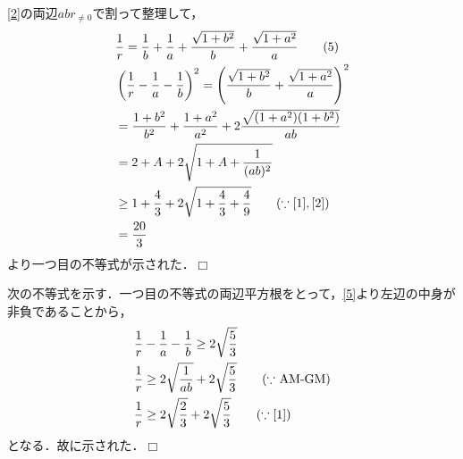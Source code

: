 \documentclass[a4j]{jarticle}
\begin{document}
\begin{multicols}{2}
\eqref{2}の両辺$abr_{\not=0}$で割って整理して，
     \begin{align*}
     &\frac{1}{r}=\frac{1}{b}+\frac{1}{a}+\frac{\sqrt{1+b^2}}{b}+\frac{\sqrt{1+a^2}}{a} \label{5}\tag{5}\\
     &\left(\frac{1}{r}-\frac{1}{a}-\frac{1}{b}\right)^2=\left(\frac{\sqrt{1+b^2}}{b}+\frac{\sqrt{1+a^2}}{a}\right)^2 \\
     &=\frac{1+b^2}{b^2}+\frac{1+a^2}{a^2}+2\frac{\sqrt{(1+a^2)(1+b^2)}}{ab} \\
     &=2+A+2\sqrt{1+A+\frac{1}{(ab)^2}} \\
     &\ge1+\frac{4}{3}+2\sqrt{1+\frac{4}{3}+\frac{4}{9}} \tag{$\because \eqref{1},\eqref{2}$}\\
     &=\frac{20}{3}
     \end{align*}
より一つ目の不等式が示された．$\Box$ 

次の不等式を示す．一つ目の不等式の両辺平方根をとって，\eqref{5}より左辺の中身が非負であることから，
     \begin{align}
     &\frac{1}{r}-\frac{1}{a}-\frac{1}{b}\ge 2\sqrt{\frac{5}{3}} \\
     &\frac{1}{r}\ge2\sqrt{\frac{1}{ab}}+2\sqrt{\frac{5}{3}} \tag{$\because$ AM-GM} \\
     &\frac{1}{r}\ge2\sqrt{\frac{2}{3}}+2\sqrt{\frac{5}{3}} \tag{$\because \eqref{1}$} 
     \end{align}
となる．故に示された．$\Box$     
     
\newpage
\end{multicols}
\end{document}
